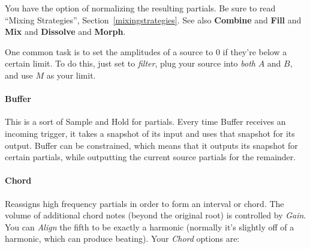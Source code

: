 \documentclass{article}
\begin{document}
You have the option of normalizing the resulting partials.   Be sure to read ``Mixing Strategies'', Section~\ref{mixingstrategies}.  See also {\bf Combine} and {\bf Fill} and {\bf Mix} and {\bf Dissolve}  and {\bf Morph}.

One common task is to set the amplitudes of a source to 0 if they're below a certain limit. To do this, just set to {\it filter}, plug your source into {\it both} \(A\) and \(B\), and use \(M\) as your limit.


\paragraph{Buffer}  This is a sort of Sample and Hold for partials.  Every time Buffer receives an incoming trigger, it takes a snapshot of its input and uses that snapshot for its output.  Buffer can be constrained, which means that it outputs its snapshot for certain partials, while outputting the current source partials for the remainder.

\paragraph{Chord}  Reassigns high frequency partials in order to form an interval or chord.  The volume of additional chord notes (beyond the original root) is controlled by {\it Gain}.  You can {\it Align} the fifth to be exactly a harmonic (normally it's slightly off of a harmonic, which can produce beating).   Your {\it Chord} options are:
\end{document}
